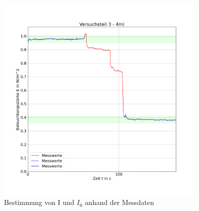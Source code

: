\documentclass{article}
\begin{document}
            
            \begin{figure}[H]
                \centering
                \includegraphics[width=0.9\textwidth]{Daten/KonzPlot4ml.png}
                \caption{Bestimmung von I und $I_0$ anhand der Messdaten}
            \end{figure}
            \hspace{1cm}
\end{document}

